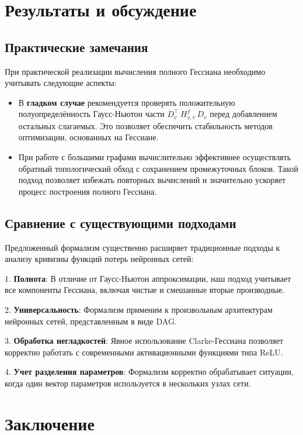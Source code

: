 \documentclass[11pt]{article}
\begin{document}
\section{Результаты и обсуждение}

\subsection{Практические замечания}

При практической реализации вычисления полного Гессиана необходимо учитывать следующие аспекты:

\begin{itemize}
  \item В \textbf{гладком случае} рекомендуется проверять положительную полуопределённость Гаусс-Ньютон части
    $D_v^\top\,H^f_{v,v}\,D_v$ перед добавлением остальных слагаемых. Это позволяет обеспечить стабильность
    методов оптимизации, основанных на Гессиане.

  \item При работе с большими графами вычислительно эффективнее осуществлять обратный топологический обход с
    сохранением промежуточных блоков. Такой подход позволяет избежать повторных вычислений и значительно
    ускоряет процесс построения полного Гессиана.
\end{itemize}

\subsection{Сравнение с существующими подходами}

Предложенный формализм существенно расширяет традиционные подходы к анализу кривизны функций потерь нейронных сетей:

1. \textbf{Полнота}: В отличие от Гаусс-Ньютон аппроксимации, наш подход учитывает все компоненты Гессиана,
включая чистые и смешанные вторые производные.

2. \textbf{Универсальность}: Формализм применим к произвольным архитектурам нейронных сетей, представленным в виде DAG.

3. \textbf{Обработка негладкостей}: Явное использование Clarke-Гессиана позволяет корректно работать с
современными активационными функциями типа ReLU.

4. \textbf{Учет разделения параметров}: Формализм корректно обрабатывает ситуации, когда один вектор
параметров используется в нескольких узлах сети.

\section{Заключение}
\end{document}
